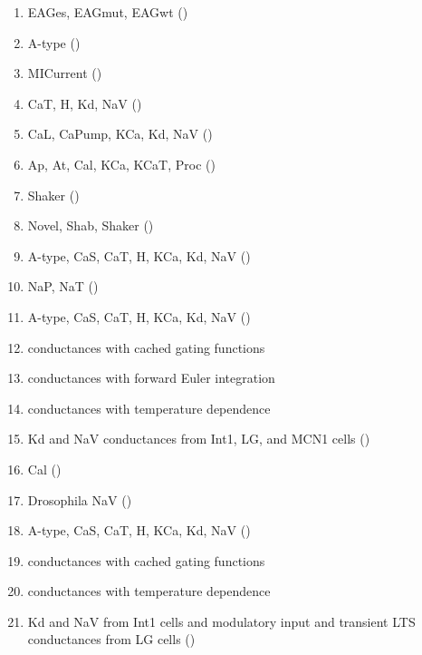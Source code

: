 \documentclass[utf8]{frontiers_suppmat} %
\begin{document}
\begin{enumerate}
	\item EAGes, EAGmut, EAGwt (\cite{bronkRegulationEagCa22018})
	\item A-type (\cite{brookingsAutomaticParameterEstimation2014})
	\item MICurrent (\cite{caplanManyParameterSets2014a})
	\item CaT, H, Kd, NaV (\cite{dethierPositiveFeedbackCellular2015a})
	\item CaL, CaPump, KCa, Kd, NaV (\cite{drionDopaminePacemakerNeuron2017})
	\item Ap, At, Cal, KCa, KCaT, Proc (\cite{goldmanGlobalStructureRobustness2001a})
	\item Shaker (\cite{hardieNovelPotassiumChannels1991})
	\item Novel, Shab, Shaker (\cite{herasModulationVoltagedependentConductances2018})
	\item A-type, CaS, CaT, H, KCa, Kd, NaV (\cite{kisperskyIncreaseSodiumConductance2012a})
	\item NaP, NaT (\cite{linActivityDependentAlternativeSplicing2012})
	\item A-type, CaS, CaT, H, KCa, Kd, NaV (\cite{liuModelNeuronActivityDependent1998})
	\item \cite{liuModelNeuronActivityDependent1998} conductances with cached gating functions
	\item \cite{liuModelNeuronActivityDependent1998} conductances with forward Euler integration
	\item \cite{liuModelNeuronActivityDependent1998} conductances with temperature dependence
	\item Kd and NaV conductances from Int1, LG, and MCN1 cells (\cite{nadimFrequencyRegulationSlow1998})
	\item Cal (\cite{nadimSynapticDepressionCreates1999})
	\item Drosophila NaV (\cite{odowdVoltageclampAnalysisSodium1988})
	\item A-type, CaS, CaT, H, KCa, Kd, NaV (\cite{prinzAlternativeHandtuningConductancebased2003a})
	\item \cite{prinzAlternativeHandtuningConductancebased2003a} conductances with cached gating functions
	\item \cite{prinzAlternativeHandtuningConductancebased2003a} conductances with temperature dependence
	\item Kd and NaV from Int1 cells and modulatory input and transient LTS conductances from LG cells (\cite{rodriguezConvergentRhythmGeneration2013})

\end{enumerate}
\end{document}
